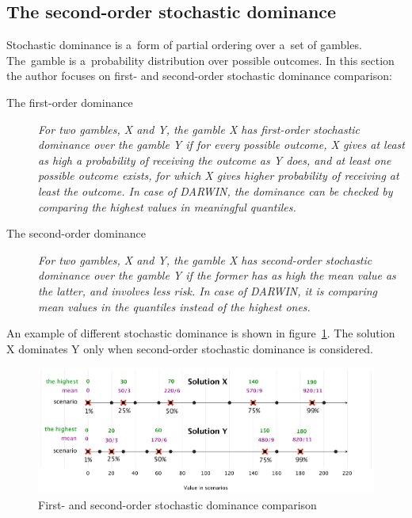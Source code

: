 \clearpage{}
\subsection{The second-order stochastic dominance}

Stochastic dominance is a~form of partial ordering over a~set of
gambles. The~gamble is a~probability distribution over possible outcomes. In
this section the author focuses on first- and second-order stochastic
dominance comparison:

\begin{description}
\item[The first-order dominance] \textit{For two gambles, X and Y, the gamble
    X has first-order stochastic dominance over the gamble Y if for every
    possible outcome, X gives at least as high a probability of receiving the
    outcome as Y does, and at least one possible outcome exists, for which X
    gives higher probability of receiving at least the outcome. In case of
    DARWIN, the dominance can be checked by comparing the highest values in
    meaningful quantiles.}

\item[The second-order dominance] \textit{For two gambles, X and Y, the gamble
    X has second-order stochastic dominance over the gamble Y if the former
    has as high the mean value as the latter, and involves less risk. In case
    of DARWIN, it is comparing mean values in the quantiles instead of the
    highest ones.}
\end{description}

An example of different stochastic dominance is shown in
figure~\ref{stochdom}. The solution X dominates Y only when second-order
stochastic dominance is considered. 

\begin{figure}[h]
  \centering
    \includegraphics[scale=0.55]{img/stochdom}
  \caption{First- and second-order stochastic dominance comparison}
  \label{stochdom}
\end{figure}

